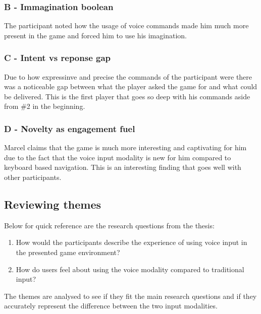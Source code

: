 \subsubsection{B - Immagination boolean}

The participant noted how the usage of voice commands made him much more present in the game and forced him to use his imagination.

\subsubsection{C - Intent vs reponse gap}

Due to how expressinve and precise the commands of the participant were there was a noticeable gap between what the player asked the game for and what could be delivered. This is the first player that goes so deep with his commands aside from \#2 in the beginning.

\subsubsection{D - Novelty as engagement fuel}

Marcel claims that the game is much more interesting and captivating for him due to the fact that the voice input modality is new for him compared to keyboard based navigation. This is an interesting finding that goes well with other participants.


\subsection{Reviewing themes}




Below for quick reference are the research questions from the thesis: 

\begin{enumerate}
    \item How would the participants describe the experience of using voice input in the presented
game environment?
    \item How do users feel about using the voice modality compared to traditional input?
\end{enumerate}

The themes are analysed to see if they fit the main research questions and if they accurately represent the difference between the two input modalities.

